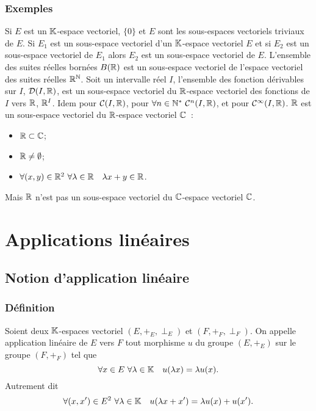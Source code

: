 \subsubsection{Exemples}
\label{subsec:exemples}

Si \(E\) est un \(\mathbb{K}\)-espace vectoriel, \(\{0\}\) et \(E\) sont les
sous-espaces vectoriels triviaux de \(E\). Si \(E_1\) est un sous-espace
vectoriel d'un \(\mathbb{K}\)-espace vectoriel \(E\) et si \(E_2\) est un sous-espace
vectoriel de \(E_1\) alors \(E_2\) est un sous-espace vectoriel de \(E\).
L'ensemble des suites réelles bornées \(B(\mathbb{R})\) est un sous-espace vectoriel de
l'espace vectoriel des suites réelles \(\mathbb{R}^{\mathbb{N}}\). Soit un intervalle réel \(I\),
l'ensemble des fonction dérivables sur \(I\), \(\mathcal{D}(I,\mathbb{R})\), est un
sous-espace vectoriel du \(\mathbb{R}\)-espace vectoriel des fonctions de \(I\) vers
\(\mathbb{R}\), \(\mathbb{R}^I\). Idem pour \(\mathcal{C}(I,\mathbb{R})\), pour \(\forall n \in \mathbb{N}^* \
\mathcal{C}^{n}(I,\mathbb{R})\), et pour \(\mathcal{C}^{\infty}(I,\mathbb{R})\). \(\mathbb{R}\) est un sous-espace
vectoriel du \(\mathbb{R}\)-espace vectoriel \(\mathbb{C}\)~:
\begin{itemize}
  \item \(\mathbb{R} \subset \mathbb{C}\);
  \item \(\mathbb{R} \neq \emptyset\);
  \item \(\forall (x,y) \in \mathbb{R}^2 \ \forall \lambda \in \mathbb{R} \quad \lambda x +y \in
    \mathbb{R}\).
\end{itemize}

Mais \(\mathbb{R}\) n'est pas un sous-espace vectoriel du \(\mathbb{C}\)-espace vectoriel
\(\mathbb{C}\).

\section{Applications linéaires}

\subsection{Notion d'application linéaire}

\subsubsection{Définition}

\begin{defdef}
  Soient deux \(\mathbb{K}\)-espaces vectoriel \((E,+_E,\perp_E)\) et
  \((F,+_F,\perp_F)\). On appelle application linéaire de \(E\) vers \(F\) tout
  morphisme \(u\) du groupe \((E,+_E)\) sur le groupe \((F,+_F)\) tel que
  \begin{equation}
    \forall x \in E \ \forall \lambda \in \mathbb{K} \quad u(\lambda x)=\lambda u(x).
  \end{equation}
  Autrement dit
  \begin{equation}
    \forall (x,x') \in E^2 \ \forall \lambda \in \mathbb{K} \quad u(\lambda x
    +x')=\lambda u(x)+u(x').
  \end{equation}
\end{defdef}

